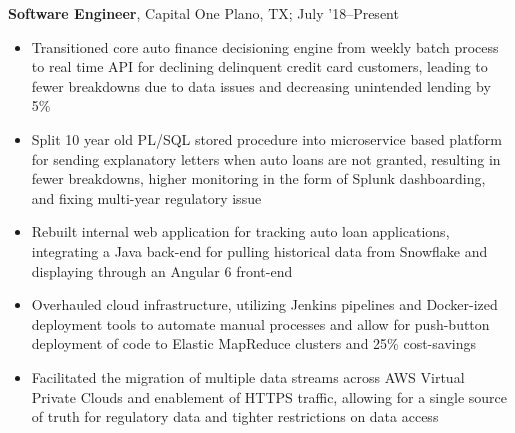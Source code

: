 \documentclass[11pt]{article}
\begin{document}
\textbf{Software Engineer}, Capital One \hfill Plano, TX; July '18--Present
\begin{itemize}
  \item Transitioned core auto finance decisioning engine from weekly batch
        process to real time API for declining delinquent credit card customers,
        leading to fewer breakdowns due to data issues and decreasing unintended
        lending by 5\%
  \item Split 10 year old PL/SQL stored procedure into microservice based
        platform for sending explanatory letters when auto loans are not granted,
        resulting in fewer breakdowns, higher monitoring in the form of Splunk dashboarding,
        and fixing multi-year regulatory issue
  \item Rebuilt internal web application for tracking auto loan applications,
        integrating a Java back-end for pulling historical data from Snowflake
        and displaying through an Angular 6 front-end
  \item Overhauled cloud infrastructure, utilizing Jenkins pipelines and
        Docker-ized deployment tools to automate manual processes and allow for
        push-button deployment of code to Elastic MapReduce clusters and 25\% cost-savings
  \item Facilitated the migration of multiple data streams across AWS Virtual
        Private Clouds and enablement of HTTPS traffic, allowing for a single source
        of truth for regulatory data and tighter restrictions on data access
\end{itemize}
\end{document}
